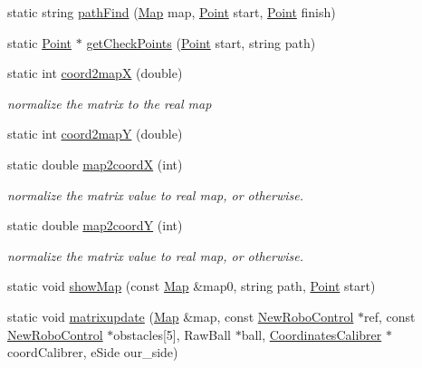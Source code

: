 \begin{DoxyCompactItemize}
\item 
static string \hyperlink{classInterpreter_a253118e59d7428286ff70a818efe0c52}{pathFind} (\hyperlink{classMatrix}{Map} map, \hyperlink{structInterpreter_1_1Point}{Point} start, \hyperlink{structInterpreter_1_1Point}{Point} finish)
\item 
static \hyperlink{structInterpreter_1_1Point}{Point} $\ast$ \hyperlink{classInterpreter_a17b252478116fc19ab8fe4623728cda8}{getCheckPoints} (\hyperlink{structInterpreter_1_1Point}{Point} start, string path)
\item 
static int \hyperlink{classInterpreter_a36e1b3f28a3d8dae2155f1f0212bed7d}{coord2mapX} (double)
\begin{DoxyCompactList}\small\item\em normalize the matrix to the real map \item\end{DoxyCompactList}\item 
static int \hyperlink{classInterpreter_a5b597351a6bdaf23fbf42aed910b151f}{coord2mapY} (double)
\item 
static double \hyperlink{classInterpreter_afaaf3930191f9ba3e48a09af193e0a39}{map2coordX} (int)
\begin{DoxyCompactList}\small\item\em normalize the matrix value to real map, or otherwise. \item\end{DoxyCompactList}\item 
static double \hyperlink{classInterpreter_abd0885c42ade8eb7f941c8d4b26a2501}{map2coordY} (int)
\begin{DoxyCompactList}\small\item\em normalize the matrix value to real map, or otherwise. \item\end{DoxyCompactList}\item 
static void \hyperlink{classInterpreter_a28fca7f91931cc48a0dc91cbbb08ba7a}{showMap} (const \hyperlink{classMatrix}{Map} \&map0, string path, \hyperlink{structInterpreter_1_1Point}{Point} start)
\item 
static void \hyperlink{classInterpreter_a4b195c13b5189f82d5b2ccd47ee4c562}{matrixupdate} (\hyperlink{classMatrix}{Map} \&map, const \hyperlink{classNewRoboControl}{NewRoboControl} $\ast$ref, const \hyperlink{classNewRoboControl}{NewRoboControl} $\ast$obstacles\mbox{[}5\mbox{]}, RawBall $\ast$ball, \hyperlink{classCoordinatesCalibrer}{CoordinatesCalibrer} $\ast$coordCalibrer, eSide our\_\-side)

\end{DoxyCompactItemize}
